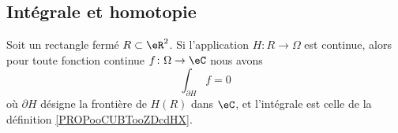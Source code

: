 \subsection{Intégrale et homotopie}

\begin{lemma}       \label{LEMooOFCEooIsuchR}
	Soit un rectangle fermé \( R\subset \eR^2\). Si l'application \( H\colon R\to \Omega\) est continue, alors pour toute fonction continue \( f\colon \Omega\to \eC\) nous avons
	\begin{equation}
		\int_{\partial H}f=0
	\end{equation}
	où \( \partial H\) désigne la frontière de \( H(R)\) dans \( \eC\), et l'intégrale est celle de la définition \ref{PROPooCUBTooZDcdHX}.
\end{lemma}

